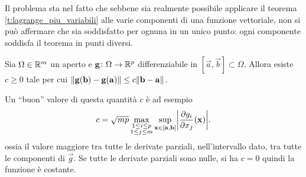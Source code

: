 Il problema sta nel fatto che sebbene sia realmente possibile applicare il teorema \ref{t:lagrange_piu_variabili} alle varie componenti di una funzione vettoriale, non si può affermare che sia soddisfatto per ognuna in un unico punto: ogni componente soddisfa il teorema in punti diversi.
\begin{teorema}
Sia $\Omega\in\R^m$ un aperto e $\vec g\colon\Omega\to\R^p$ differenziabile in $[\vec a,\vec b]\subset\Omega$. Allora esiste $c\geq 0$ tale per cui $\norm{\vec g(\vec b)-\vec g(\vec a)}\leq c\norm{\vec b-\vec a}$.
\end{teorema}
Un ``buon'' valore di questa quantità $c$ è ad esempio
\begin{equation*}
	c=\sqrt{mp}\max_{\substack{1\leq i\leq p\\1\leq j\leq m}}\sup_{\vec x\in[\vec a,\vec b]}\abs[\bigg]{\drp{g_i}{x_j}(\vec x)}.
\end{equation*}
ossia il valore maggiore tra tutte le derivate parziali, nell'intervallo dato, tra tutte le componenti di $\vec g$.
Se tutte le derivate parziali sono nulle, si ha $c=0$ quindi la funzione è costante.

